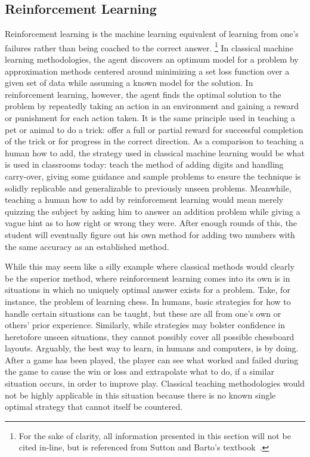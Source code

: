 \subsection{Reinforcement Learning}
\label{sec:intro-reinf}



Reinforcement learning is the machine learning equivalent of learning from one's
failures
rather than being coached to the correct answer.%
\footnote{
	For the sake of clarity,
	all information presented in this section will not be cited in-line,
	but is referenced from Sutton and Barto's textbook~\cite{rl_book}.
}
%
In classical machine learning methodologies,
the agent discovers an optimum model for a problem by approximation methods
centered around minimizing a set loss function over a given set of data
while assuming a known model for the solution.
%
In reinforcement learning,
however,
the agent finds the optimal solution to the problem by repeatedly taking an
action in an environment and gaining a reward or punishment for each
action taken.
%
It is the same principle used in teaching a pet or animal to do a trick:
offer a full or partial reward for successful completion of the trick or
for progress in the correct direction.
%
As a comparison to teaching a human how to add,
the strategy used in classical machine learning would be what is used in
classrooms today:
teach the method of adding digits and handling carry-over,
giving some guidance and sample problems to ensure the technique is solidly
replicable and generalizable to previously unseen problems.
%
Meanwhile, teaching a human how to add by reinforcement learning would
mean merely quizzing the subject by asking him to answer an addition problem
while giving a vague hint as to how right or wrong they were.
%
After enough rounds of this,
the student will eventually figure out his own method for adding two numbers
with the same accuracy as an established method.

While this may seem like a silly example where classical methods would clearly
be the superior method,
where reinforcement learning comes into its own is in situations in which no
uniquely optimal answer exists for a problem.
%
Take, for instance, the problem of learning chess.
%
In humans,
basic strategies for how to handle certain situations can be taught,
but these are all from one's own or others' prior experience.
%
Similarly,
while strategies may bolster confidence in heretofore unseen situations,
they cannot possibly cover all possible chessboard layouts.
%
Arguably, the best way to learn, in humans and computers, is by doing.
%
%
After a game has been played,
the player can see what worked and failed during the game to cause the win or
loss and extrapolate what to do,
if a similar situation occurs,
in order to improve play.
%
Classical teaching methodologies would not be highly applicable in this
situation because there is
no known single optimal strategy that cannot itself be countered.

